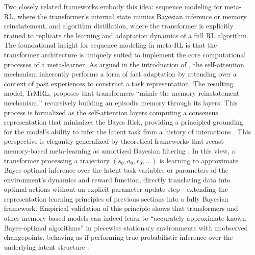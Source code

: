 \documentclass[11pt]{article}
\begin{document}
Two closely related frameworks embody this idea: sequence modeling for meta-RL, where the transformer's internal state mimics Bayesian inference or memory reinstatement, and algorithm distillation, where the transformer is explicitly trained to replicate the learning and adaptation dynamics of a full RL algorithm. The foundational insight for sequence modeling in meta-RL is that the transformer architecture is uniquely suited to implement the core computational processes of a meta-learner. As argued in the introduction of \cite{ref363}, the self-attention mechanism inherently performs a form of fast adaptation by attending over a context of past experiences to construct a task representation. The resulting model, TrMRL, proposes that transformers ``mimic the memory reinstatement mechanism,'' recursively building an episodic memory through its layers. This process is formalized as the self-attention layers computing a consensus representation that minimizes the Bayes Risk, providing a principled grounding for the model's ability to infer the latent task from a history of interactions \cite{ref363}. This perspective is elegantly generalized by theoretical frameworks that recast memory-based meta-learning as amortized Bayesian filtering \cite{ref364}. In this view, a transformer processing a trajectory \((s_0, a_0, r_0, \ldots)\) is learning to approximate Bayes-optimal inference over the latent task variables or parameters of the environment's dynamics and reward function, directly translating data into optimal actions without an explicit parameter update step---extending the representation learning principles of previous sections into a fully Bayesian framework. Empirical validation of this principle shows that transformers and other memory-based models can indeed learn to ``accurately approximate known Bayes-optimal algorithms'' in piecewise stationary environments with unobserved changepoints, behaving as if performing true probabilistic inference over the underlying latent structure \cite{ref365}.
\end{document}
